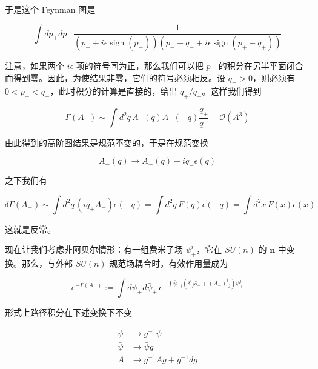 于是这个 Feynman 图是

\begin{equation}
  \int dp_+dp_-\,\frac{1}{(p_-+i\epsilon\operatorname{sign}(p_+))(p_--q_-+i\epsilon\operatorname{sign}(p_+-q_+))}
  \tag{4.107}
  \label{eq:4.107}
\end{equation}

注意，如果两个 $i\epsilon$ 项的符号同为正，那么我们可以把 $p_-$ 的积分在另半平面闭合而得到零。因此，为使结果非零，它们的符号必须相反。设 $q_+>0$，则必须有 $0<p_+<q_+$，此时积分的计算是直接的，给出 $q_+/q_-$。这样我们得到

\begin{equation}
  \Gamma(A_-)\sim\int d^2q\,A_-(q)A_-(-q)\frac{q_+}{q_-}+\mathcal{O}(A^3)
  \tag{4.108}
  \label{eq:4.108}
\end{equation}


由此得到的高阶图结果是规范不变的，于是在规范变换

\begin{equation}
  A_-(q)\to A_-(q)+iq_-\epsilon(q)
  \tag{4.109}
  \label{eq:4.109}
\end{equation}

之下我们有

\begin{equation}
  \delta\Gamma(A_-)\sim\int d^2q\,(iq_+A_-)\epsilon(-q)=\int d^2q\,F(q)\epsilon(-q)=\int d^2x\,F(x)\epsilon(x)
  \tag{4.110}
  \label{eq:4.110}
\end{equation}

这就是反常。

现在让我们考虑非阿贝尔情形：有一组费米子场 $\psi^i_+$，它在 $SU(n)$ 的 $\mathbf{n}$ 中变换。那么，与外部 $SU(n)$ 规范场耦合时，有效作用量成为

\begin{equation}
  e^{-\Gamma(A_-)}:=\int d\psi_+d\bar\psi_+\,e^{-\int\bar\psi_{+i}\left(\delta^i{}_j\partial_-+(A_-)^i{}_j\right)\psi_+^j}
  \tag{4.111}
  \label{eq:4.111}
\end{equation}

形式上路径积分在下述变换下不变

\begin{equation}
  \begin{aligned}
    \psi &\to g^{-1}\psi\\
    \bar\psi &\to\bar\psi g\\
    A &\to g^{-1}Ag+g^{-1}dg
  \end{aligned}
  \tag{4.112}
  \label{eq:4.112}
\end{equation}

